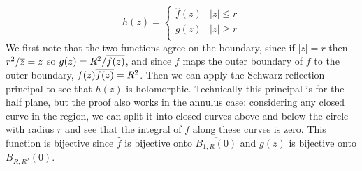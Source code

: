 \documentclass{homework}
\begin{document}
\begin{solution}
                                                                                                                                                                            \[
                                                                                                                                                                            h(z) = \begin{cases}
                                                                                                                                                                            \hat{f}(z) & |z| \leq r\\
                                                                                                                                                                            g(z) & |z| \geq r\\
                                                                                                                                                                            \end{cases}
                                                                                                                                                                            \]
                                                                                                                                                                            We first note that the two functions agree on the boundary, since if $|z|=r$ then $r^2/\overline{z} = z$ so $g(z) = R^2/\overline{f(z)}$, and since $f$ maps the outer boundary of $f$ to the outer boundary, $f(z)\overline{f(z)} = R^2$. Then we can apply the Schwarz reflection principal to see that $h(z)$ is holomorphic. Technically this principal is for the half plane, but the proof also works in the annulus case: considering any closed curve in the region, we can split it into closed curves above and below the circle with radius $r$ and see that the integral of $f$ along these curves is zero. This function is bijective since $\hat{f}$ is bijective onto $\overline{B_{1, R}(0)}$ and $g(z)$ is bijective onto $\overline{B_{R, R^2}(0)}$.



\end{solution}
\end{document}
